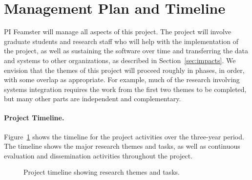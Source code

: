 \section{Management Plan and Timeline}\label{sec:management}

PI Feamster will manage all aspects of this project. The project will involve
graduate students and research staff who will help with the implementation of
the project, as well as sustaining the software over time and transferring the
data and systems to other organizations, as described in
Section~\ref{sec:impacts}. We envision that the themes of this project will
proceed roughly in phases, in order, with some overlap as appropriate. For
example, much of the research involving systems integration requires the work
from the first two themes to be completed, but many other parts are
independent and complementary.

\paragraph{Project Timeline.} Figure~\ref{fig:gantt} shows the timeline for
the project activities over the three-year period. The timeline shows the major
research themes and tasks, as well as continuous evaluation and dissemination
activities throughout the project.

\begin{figure}[h!]
\centering

\caption{Project timeline showing research themes and tasks.}
\label{fig:gantt}
\end{figure}
